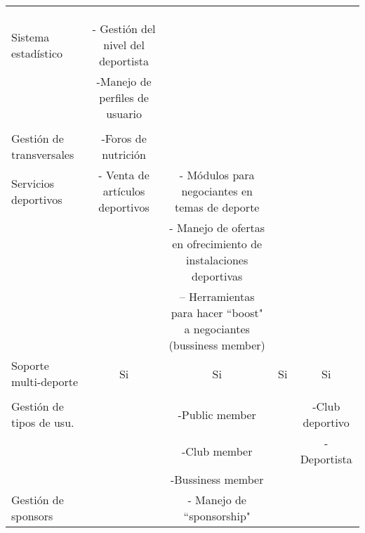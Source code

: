 \begin{landscape}
\begin{table}
\begin{center}
{\begin{tabular}{|l|llll|}
 & \multicolumn{1}{c}{} & \multicolumn{1}{c}{} & \multicolumn{1}{c}{} & \multicolumn{1}{c|}{} \\ 
 & \multicolumn{1}{c}{} & \multicolumn{1}{c}{} & \multicolumn{1}{c}{} & \multicolumn{1}{c|}{} \\ 
 & \multicolumn{1}{c}{} & \multicolumn{1}{c}{} & \multicolumn{1}{c}{} & \multicolumn{1}{c|}{} \\ 
\hline
Sistema estadístico & \multicolumn{1}{c}{- Gestión del nivel del deportista} & \multicolumn{1}{c}{} & \multicolumn{1}{c}{} & \multicolumn{1}{c|}{} \\ 
 & \multicolumn{1}{c}{-Manejo de perfiles de usuario} & \multicolumn{1}{c}{} & \multicolumn{1}{c}{} & \multicolumn{1}{c|}{} \\ 
 & \multicolumn{1}{c}{} & \multicolumn{1}{c}{} & \multicolumn{1}{c}{} & \multicolumn{1}{c|}{} \\ 
\hline
Gestión de transversales & \multicolumn{1}{c}{-Foros de nutrición} & \multicolumn{1}{c}{} & \multicolumn{1}{c}{} & \multicolumn{1}{c|}{} \\ 
\hline
Servicios deportivos & \multicolumn{1}{c}{- Venta de artículos deportivos} & \multicolumn{1}{c}{- Módulos para negociantes en temas de deporte} & \multicolumn{1}{c}{} & \multicolumn{1}{c|}{} \\ 
 & \multicolumn{1}{c}{} & \multicolumn{1}{c}{- Manejo de ofertas en ofrecimiento de instalaciones deportivas} & \multicolumn{1}{c}{} & \multicolumn{1}{c|}{} \\ 
 & \multicolumn{1}{c}{} & \multicolumn{1}{c}{-- Herramientas para hacer ``boost" a negociantes (bussiness member)} & \multicolumn{1}{c}{} & \multicolumn{1}{c|}{} \\ 
\hline
Soporte multi-deporte & \multicolumn{1}{c}{Si} & \multicolumn{1}{c}{Si} & \multicolumn{1}{c}{Si} & \multicolumn{1}{c|}{Si} \\ 
 & \multicolumn{1}{c}{} & \multicolumn{1}{c}{} & \multicolumn{1}{c}{} & \multicolumn{1}{c|}{} \\ 
\hline
Gestión de tipos de usu. & \multicolumn{1}{c}{} & \multicolumn{1}{c}{-Public member} & \multicolumn{1}{c}{} & \multicolumn{1}{c|}{-Club deportivo} \\ 
 & \multicolumn{1}{c}{} & \multicolumn{1}{c}{-Club member} & \multicolumn{1}{c}{} & \multicolumn{1}{c|}{-Deportista} \\ 
 & \multicolumn{1}{c}{} & \multicolumn{1}{c}{-Bussiness member} & \multicolumn{1}{c}{} & \multicolumn{1}{c|}{} \\ 
\hline
Gestión de sponsors & \multicolumn{1}{c}{} & \multicolumn{1}{c}{- Manejo de ``sponsorship"} & \multicolumn{1}{c}{} & \multicolumn{1}{c|}{} \\ 

\end{tabular}}
\end{center}
\end{table}
\end{landscape}
